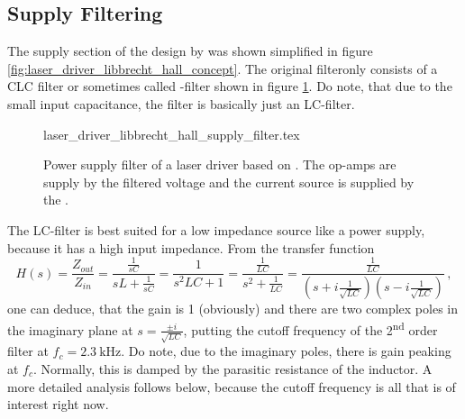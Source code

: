 \clearpage
\subsection{Supply Filtering}
The supply section of the design by \citeauthor{libbrecht_hall} was shown simplified in figure \ref{fig:laser_driver_libbrecht_hall_concept}. The original filteronly consists of a CLC filter or sometimes called \pi-filter shown in figure \ref{fig:laser_driver_libbrecht_hall_filter}. Do note, that due to the small input capacitance, the filter is basically just an LC-filter.

\begin{figure}[ht]
    \centering
        {laser_driver_libbrecht_hall_supply_filter.tex}
    \caption{Power supply filter of a laser driver based on \cite{libbrecht_hall}. The op-amps are supply by the filtered voltage and the current source is supplied by the .}
    \label{fig:laser_driver_libbrecht_hall_filter}
\end{figure}

The LC-filter is best suited for a low impedance source like a power supply, because it has a high input impedance. From the transfer function
\begin{equation}
    H(s) = \frac{Z_{out}}{Z_{in}} = \frac{\frac{1}{sC}}{sL + \frac{1}{sC}} = \frac{1}{s^2LC +1} = \frac{\frac{1}{LC}}{s^2 + \frac{1}{LC}} = \frac{\frac{1}{LC}}{\left(s+i\frac{1}{\sqrt{LC}}\right)\left(s-i\frac{1}{\sqrt{LC}}\right)}\,, \label{eqn:transfer_function_lc_filter}
\end{equation}
one can deduce, that the gain is \num{1} (obviously) and there are two complex poles in the imaginary plane at $s = \frac{\pm i}{\sqrt{LC}}$, putting the cutoff frequency of the 2\textsuperscript{nd} order filter at $f_c = \qty{2.3}{\kHz}$. Do note, due to the imaginary poles, there is gain peaking at $f_c$. Normally, this is damped by the parasitic resistance of the inductor. A more detailed analysis follows below, because the cutoff frequency is all that is of interest right now.

